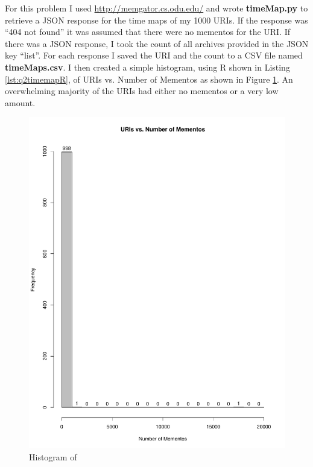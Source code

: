 \documentclass[letterpaper,11pt]{article}
\newcommand*{\srcPath}{../src}%
\begin{document}
For this problem I used  \url{http://memgator.cs.odu.edu/} and wrote \textbf{timeMap.py} to retrieve a JSON response for the time maps of my 1000 URIs. If the response was ``404 not found'' it was assumed that there were no mementos for the URI. If there was a JSON response, I took the count of all archives provided in the JSON key ``list''. For each response I saved the URI and the count to a CSV file named \textbf{timeMaps.csv}. I then created a simple histogram, using R shown in Listing \ref{lst:q2timemapR}, of URIs vs. Number of Mementos as shown in Figure \ref{fig:q2histogram}. An overwhelming majority of the URIs had either no mementos or a very low amount.



\begin{figure}[h]
\centering
\includegraphics[scale=0.8]{timemapHistogram.pdf}
\caption{Histogram of }
\label{fig:q2histogram}
\end{figure}
\end{document}

